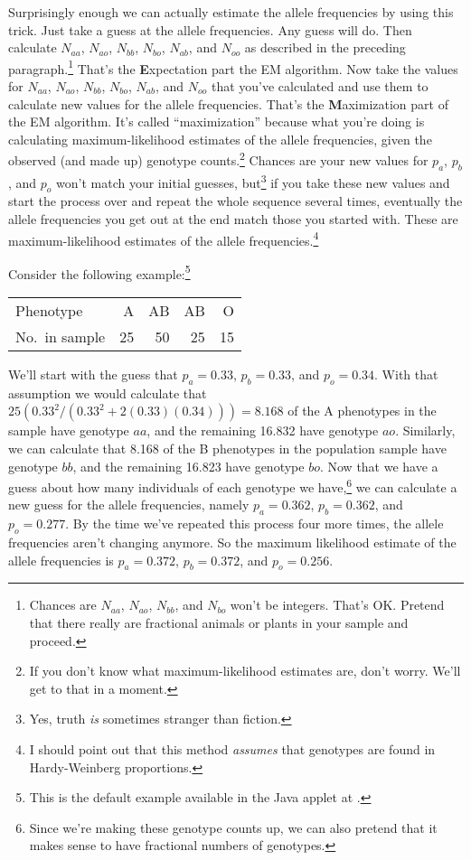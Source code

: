 Surprisingly enough we can actually estimate the allele frequencies by
using this trick. Just take a guess at the allele frequencies. Any
guess will do. Then calculate $N_{aa}$, $N_{ao}$, $N_{bb}$, $N_{bo}$,
$N_{ab}$, and $N_{oo}$ as described in the preceding
paragraph.\footnote{Chances are $N_{aa}$, $N_{ao}$, $N_{bb}$, and
  $N_{bo}$ won't be integers. That's OK. Pretend that there really are
  fractional animals or plants in your sample and proceed.} That's the
{\bf E}xpectation part the EM algorithm. Now take the values for
$N_{aa}$, $N_{ao}$, $N_{bb}$, $N_{bo}$, $N_{ab}$, and $N_{oo}$ that
you've calculated and use them to calculate new values for the allele
frequencies. That's the {\bf M}aximization part of the EM
algorithm. It's called ``maximization'' because what you're doing is
calculating maximum-likelihood estimates of the allele frequencies,
given the observed (and made up) genotype counts.\footnote{If you
  don't know what maximum-likelihood estimates are, don't worry. We'll
  get to that in a moment.} Chances are your new values for $p_a$,
$p_b$, and $p_o$ won't match your initial guesses, but\footnote{Yes,
  truth {\it is\/} sometimes stranger than fiction.}  if you take
these new values and start the process over and repeat the whole
sequence several times, eventually the allele frequencies you get out
at the end match those you started with. These are maximum-likelihood
estimates of the allele frequencies.\footnote{I should point out that
  this method {\it assumes\/} that genotypes are found in
  Hardy-Weinberg proportions.}

Consider the following example:\footnote{This is the default example
available in the Java applet at
.}
\begin{center}
\begin{tabular}{l|rrrr}
\hline\hline
Phenotype      & A      & AB      & AB     & O  \\
No.\ in sample & 25     & 50      & 25     & 15 \\
\hline
\end{tabular}
\end{center}
We'll start with the guess that $p_a = 0.33$, $p_b = 0.33$, and $p_o =
0.34$. With that assumption we would calculate that $25(0.33^2/(0.33^2
+ 2(0.33)(0.34))) = 8.168$ of the A phenotypes in the sample have
genotype $aa$, and the remaining 16.832 have genotype $ao$. Similarly,
we can calculate that 8.168 of the B phenotypes in the population
sample have genotype $bb$, and the remaining 16.823 have genotype
$bo$. Now that we have a guess about how many individuals of each
genotype we have,\footnote{Since we're making these genotype counts
  up, we can also pretend that it makes sense to have fractional
  numbers of genotypes.} we can calculate a new guess for the allele
frequencies, namely $p_a = 0.362$, $p_b = 0.362$, and $p_o =
0.277$. By the time we've repeated this process four more times, the
allele frequencies aren't changing anymore. So the maximum likelihood
estimate of the allele frequencies is $p_a = 0.372$, $p_b = 0.372$,
and $p_o = 0.256$.

